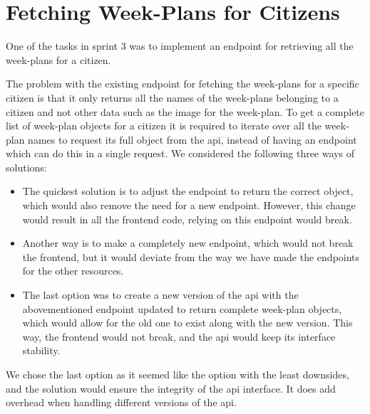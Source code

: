\section{Fetching Week-Plans for Citizens} \label{sec:webIssue9}

One of the tasks in sprint 3 was to implement an endpoint for retrieving all the week-plans for a \gls{citizen}. 

The problem with the existing endpoint for fetching the week-plans for a specific \gls{citizen} is that it only returns all the names of the week-plans belonging to a \gls{citizen} and not other data such as the image for the week-plan. To get a complete list of week-plan objects for a \gls{citizen} it is required to iterate over all the week-plan names to request its full object from the \gls{api}, instead of having an endpoint which can do this in a single request. We considered the following three ways of solutions:

\begin{itemize}
    \item The quickest solution is to adjust the endpoint to return the correct object, which would also remove the need for a new endpoint. However, this change would result in all the frontend code, relying on this endpoint would break.
    \item Another way is to make a completely new endpoint, which would not break the frontend, but it would deviate from the way we have made the endpoints for the other resources.
    \item The last option was to create a new version of the \gls{api} with the abovementioned endpoint updated to return complete week-plan objects, which would allow for the old one to exist along with the new version. This way, the frontend would not break, and the \gls{api} would keep its interface stability.
\end{itemize}

We chose the last option as it seemed like the option with the least downsides, and the solution would ensure the integrity of the \gls{api} interface. It does add overhead when handling different versions of the \gls{api}.
